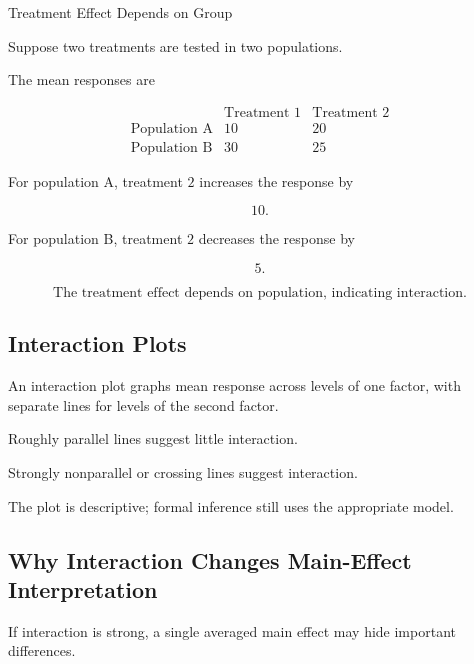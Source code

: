 \begin{workedexamplebox}{Treatment Effect Depends on Group}

Suppose two treatments are tested in two populations.

The mean responses are

\[
\begin{array}{c|cc}
&
\text{Treatment 1}
&
\text{Treatment 2}
\\
\hline
\text{Population A}
&
10
&
20
\\
\text{Population B}
&
30
&
25
\end{array}
\]

For population A, treatment \(2\) increases the response by

\[
10.
\]

For population B, treatment \(2\) decreases the response by

\[
5.
\]

\begin{answerbox}
\[
\boxed{
\text{The treatment effect depends on population, indicating
interaction.}
}
\]
\end{answerbox}

\end{workedexamplebox}

\subsection{Interaction Plots}
\label{subsec:interaction-plots}

An interaction plot graphs mean response across levels of one factor,
with separate lines for levels of the second factor.

Roughly parallel lines suggest little interaction.

Strongly nonparallel or crossing lines suggest interaction.

The plot is descriptive; formal inference still uses the appropriate
model.

\subsection{Why Interaction Changes Main-Effect Interpretation}
\label{subsec:interaction-main-effects}

If interaction is strong, a single averaged main effect may hide
important differences.

